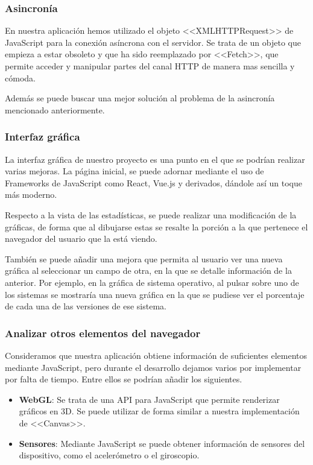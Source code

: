 \subsubsection{Asincronía}
En nuestra aplicación hemos utilizado el objeto <<XMLHTTPRequest>> de JavaScript para la conexión asíncrona con el servidor. Se trata de un objeto que empieza a estar obsoleto y que ha sido reemplazado por <<Fetch>>, que permite acceder y manipular partes del canal HTTP de manera mas sencilla y cómoda.\par 
Además se puede buscar una mejor solución al problema de la asincronía mencionado anteriormente.
\subsubsection{Interfaz gráfica}
La interfaz gráfica de nuestro proyecto es una punto en el que se podrían realizar varias mejoras. La página inicial, se puede adornar mediante el uso de Frameworks de JavaScript como React, Vue.js y derivados, dándole así un toque más moderno. \par 
Respecto a la vista de las estadísticas, se puede realizar una modificación de la gráficas, de forma que al dibujarse estas se resalte la porción a la que pertenece el navegador del usuario que la está viendo.\par 
También se puede añadir una mejora que permita al usuario ver una nueva gráfica al seleccionar un campo de otra, en la que se detalle información de la anterior. Por ejemplo, en la gráfica de sistema operativo, al pulsar sobre uno de los sistemas se mostraría una nueva gráfica en la que se pudiese ver el porcentaje de cada una de las versiones de ese sistema.
\subsubsection{Analizar otros elementos del navegador}
Consideramos que nuestra aplicación obtiene información de suficientes elementos mediante JavaScript, pero durante el desarrollo dejamos varios por implementar por falta de tiempo. Entre ellos se podrían añadir los siguientes.
\begin{itemize}
    \item \textbf{WebGL}: Se trata de una API para JavaScript que permite renderizar gráficos en 3D. Se puede utilizar de forma similar a nuestra implementación de <<Canvas>>.
    \item \textbf{Sensores}: Mediante JavaScript se puede obtener información de sensores del dispositivo, como el acelerómetro o el giroscopio.
\end{itemize}
